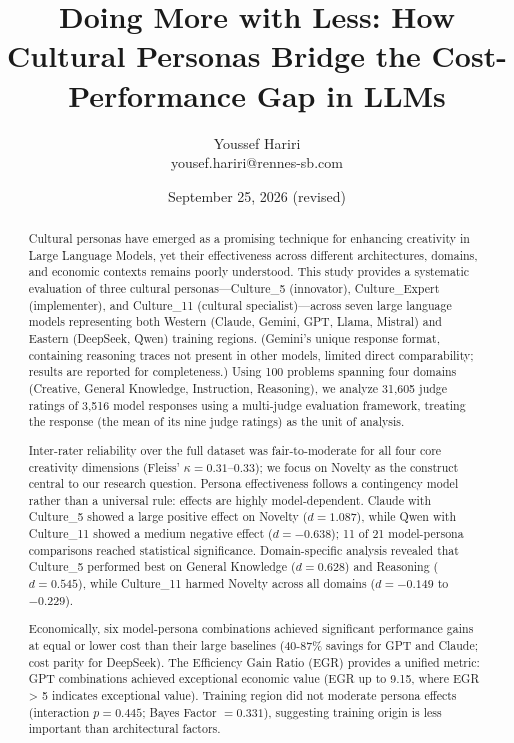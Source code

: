 \documentclass{article}
\begin{document}
\title{Doing More with Less: How Cultural Personas Bridge the Cost-Performance Gap in LLMs}
\author{Youssef Hariri \\ yousef.hariri@rennes-sb.com}
\date{September 25, 2026 (revised)}
\maketitle


\begin{abstract}

Cultural personas have emerged as a promising technique for enhancing creativity in Large Language Models, yet their effectiveness across different architectures, domains, and economic contexts remains poorly understood. This study provides a systematic evaluation of three cultural personas—Culture\_5 (innovator), Culture\_Expert (implementer), and Culture\_11 (cultural specialist)—across seven large language models representing both Western (Claude, Gemini, GPT, Llama, Mistral) and Eastern (DeepSeek, Qwen) training regions. (Gemini's unique response format, containing reasoning traces not present in other models, limited direct comparability; results are reported for completeness.) Using 100 problems spanning four domains (Creative, General Knowledge, Instruction, Reasoning), we analyze 31,605 judge ratings of 3,516 model responses using a multi-judge evaluation framework, treating the response (the mean of its nine judge ratings) as the unit of analysis.

Inter-rater reliability over the full dataset was fair-to-moderate for all four core creativity dimensions (Fleiss' \(\kappa = 0.31\)--\(0.33\)); we focus on Novelty as the construct central to our research question. Persona effectiveness follows a contingency model rather than a universal rule: effects are highly model-dependent. Claude with Culture\_5 showed a large positive effect on Novelty (\(d = 1.087\)), while Qwen with Culture\_11 showed a medium negative effect (\(d = -0.638\)); 11 of 21 model-persona comparisons reached statistical significance. Domain-specific analysis revealed that Culture\_5 performed best on General Knowledge (\(d = 0.628\)) and Reasoning (\(d = 0.545\)), while Culture\_11 harmed Novelty across all domains (\(d = -0.149\) to \(-0.229\)).

Economically, six model-persona combinations achieved significant performance gains at equal or lower cost than their large baselines (40-87\% savings for GPT and Claude; cost parity for DeepSeek). The Efficiency Gain Ratio (EGR) provides a unified metric: GPT combinations achieved exceptional economic value (EGR up to 9.15, where EGR > 5 indicates exceptional value). Training region did not moderate persona effects (interaction \(p = 0.445\); Bayes Factor \(= 0.331\)), suggesting training origin is less important than architectural factors.


\end{abstract}
\end{document}
